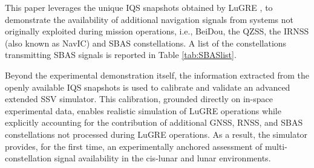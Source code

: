 \documentclass{IEEEtaes}
\begin{document}
This paper leverages the unique \gls{IQS} snapshots obtained by \gls{LuGRE} \cite{parker2022lunar, konitzer2024science}, to demonstrate the availability of additional navigation signals from systems not originally exploited during mission operations, i.e., BeiDou, the \gls{QZSS}, the \gls{IRNSS} (also known as NavIC) and \gls{SBAS} constellations. A list of the constellations transmitting \gls{SBAS} signals is reported in Table \ref{tab:SBASlist}.

Beyond the experimental demonstration itself, the information extracted from the openly available \gls{IQS} snapshots \cite{parker2025lunar} is used to calibrate and validate an advanced extended \gls{SSV} simulator. This calibration, grounded directly on in-space experimental data, enables realistic simulation of \gls{LuGRE} operations while explicitly accounting for the contribution of additional \gls{GNSS}, \gls{RNSS}, and \gls{SBAS} constellations not processed during \gls{LuGRE} operations. As a result, the simulator provides, for the first time, an experimentally anchored assessment of multi-constellation signal availability in the cis-lunar and lunar environments.



\end{document}
